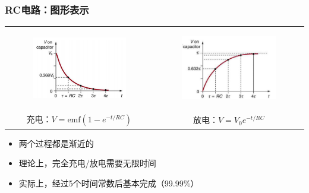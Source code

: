 \documentclass{beamer}
\begin{document}
\begin{frame}
    \frametitle{RC电路：图形表示}
    \begin{center}
        \begin{tabular}{cc}
            \begin{figure}
                \centering
                \includegraphics[width=0.5\linewidth]{dischcurve.png}
            \end{figure} 
            &
            \begin{figure}
                \centering
                \includegraphics[width=0.4\linewidth]{charge.png}
            \end{figure} \\
            充电：$V = \text{emf}(1-e^{-t/RC})$ & 放电：$V = V_0e^{-t/RC}$
        \end{tabular}
    \end{center}
    \begin{itemize}
        \item 两个过程都是渐近的
        \item 理论上，完全充电/放电需要无限时间
        \item 实际上，经过5个时间常数后基本完成（99.99\%）
    \end{itemize}
\end{frame}

\end{document}
